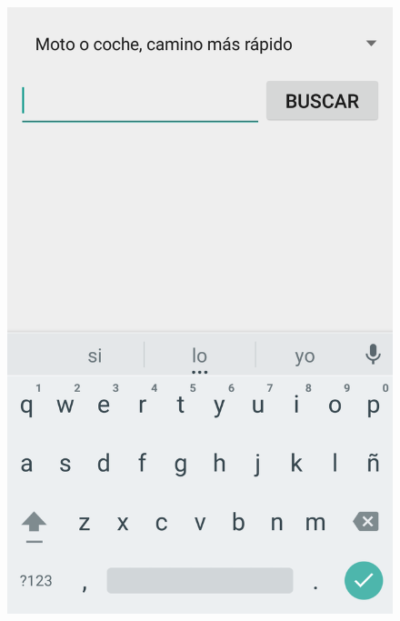 \begin{slide}
\begin{center}
\begin{minipage}[b]{0.3\linewidth}
\begin{center}
\begin{figure}
        \end{figure}
      \end{center}
    \end{minipage}
  \end{center}
\end{slide}

\begin{slide}
  \begin{center}
    \begin{minipage}[b]{0.3\linewidth}
      \begin{center}
        \begin{figure}
          \includegraphics[height=0.65\textheight]{img/naviganto-destinoini.png}
        \end{figure}

\end{center}
\end{minipage}
\end{center}
\end{slide}
